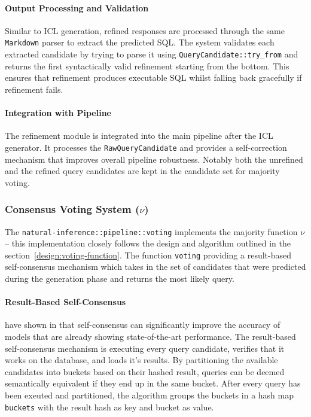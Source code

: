 \paragraph{Output Processing and Validation}

Similar to ICL generation, refined responses are processed through the same
\texttt{Markdown} parser to extract the predicted SQL. The system validates each
extracted candidate by trying to parse it using \texttt{QueryCandidate::try\_from}
and returns the first syntactically valid refinement starting from the bottom.
This ensures that refinement produces executable SQL whilst falling back
gracefully if refinement fails.

\paragraph{Integration with Pipeline}

The refinement module is integrated into the main pipeline after the ICL
generator. It processes the \texttt{RawQueryCandidate} and provides a
self-correction mechanism that improves overall pipeline robustness. Notably both
the unrefined and the refined query candidates are kept in the candidate set
for majority voting.

\subsubsection{Consensus Voting System ($\nu$)}

The \texttt{natural-inference::pipeline::voting} implements the majority
function $\nu$ – this implementation closely follows the design and algorithm
outlined in the section~\ref{design:voting-function}. The function \texttt{voting}
providing a result-based self-consensus mechanism which takes in the set of
candidates that were predicted during the generation phase and returns the most
likely query.

\paragraph{Result-Based Self-Consensus}

\citeauthor{OmniSQL} have shown in \citeyear{OmniSQL} that self-consensus can 
significantly improve the accuracy of models that are already showing 
state-of-the-art performance. The result-based self-consensus mechanism is
executing every query candidate, verifies that it works on the database, and
loads it's results. By partitioning the available candidates into buckets based
on their hashed result, queries can be deemed semantically equivalent if they
end up in the same bucket. After every query has been exeuted and partitioned,
the algorithm groups the buckets in a hash map \texttt{buckets} with the result
hash as key and bucket as value.

